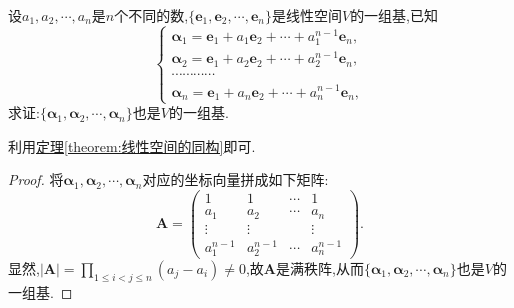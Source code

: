 \documentclass[../../main.tex]{subfiles}
\begin{document}
\begin{example}\label{example:3.110.1}
设\(a_1,a_2,\cdots,a_n\)是\(n\)个不同的数,\(\{\boldsymbol{e}_1,\boldsymbol{e}_2,\cdots,\boldsymbol{e}_n\}\)是线性空间\(V\)的一组基,已知
\[
\begin{cases}
\boldsymbol{\alpha}_1=\boldsymbol{e}_1 + a_1\boldsymbol{e}_2+\cdots + a_1^{n - 1}\boldsymbol{e}_n,\\
\boldsymbol{\alpha}_2=\boldsymbol{e}_1 + a_2\boldsymbol{e}_2+\cdots + a_2^{n - 1}\boldsymbol{e}_n,\\
\cdots\cdots\cdots\cdots\\
\boldsymbol{\alpha}_n=\boldsymbol{e}_1 + a_n\boldsymbol{e}_2+\cdots + a_n^{n - 1}\boldsymbol{e}_n,
\end{cases}
\]
求证:\(\{\boldsymbol{\alpha}_1,\boldsymbol{\alpha}_2,\cdots,\boldsymbol{\alpha}_n\}\)也是\(V\)的一组基.
\end{example}
\begin{note}
利用\hyperref[theorem:线性空间的同构]{定理\ref{theorem:线性空间的同构}}即可.
\end{note}
\begin{proof}
将\(\boldsymbol{\alpha}_1,\boldsymbol{\alpha}_2,\cdots,\boldsymbol{\alpha}_n\)对应的坐标向量拼成如下矩阵:
\[
\boldsymbol{A}=\begin{pmatrix}
1&1&\cdots&1\\
a_1&a_2&\cdots&a_n\\
\vdots&\vdots&&\vdots\\
a_1^{n - 1}&a_2^{n - 1}&\cdots&a_n^{n - 1}
\end{pmatrix}.
\]
显然,\(|\boldsymbol{A}|=\prod_{1\leq i<j\leq n}(a_j - a_i)\neq0\),故\(\boldsymbol{A}\)是满秩阵,从而\(\{\boldsymbol{\alpha}_1,\boldsymbol{\alpha}_2,\cdots,\boldsymbol{\alpha}_n\}\)也是\(V\)的一组基. 
\end{proof}
\end{document}
